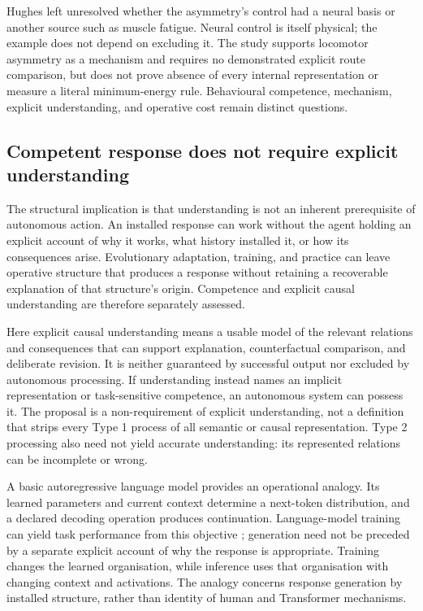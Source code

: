 \documentclass[11pt,a4paper]{article}
\theoremstyle{remark}
\begin{document}
Hughes left unresolved whether the asymmetry's control had a neural basis
or another source such as muscle fatigue. Neural control is itself physical;
the example does not depend on excluding it. The study supports locomotor
asymmetry as a mechanism and requires no demonstrated explicit route
comparison, but does not prove absence of every internal representation or
measure a literal minimum-energy rule. Behavioural competence, mechanism,
explicit understanding, and operative cost remain distinct questions.

\subsection{Competent response does not require explicit understanding}\label{sec:understanding}

The structural implication is that understanding is not an inherent
prerequisite of autonomous action. An installed response can work without
the agent holding an explicit account of why it works, what history installed
it, or how its consequences arise. Evolutionary adaptation, training, and
practice can leave operative structure that produces a response without
retaining a recoverable explanation of that structure's origin. Competence
and explicit causal understanding are therefore separately assessed.

Here explicit causal understanding means a usable model of the relevant
relations and consequences that can support explanation, counterfactual
comparison, and deliberate revision. It is neither guaranteed by successful
output nor excluded by autonomous processing. If understanding instead names
an implicit representation or task-sensitive competence, an autonomous
system can possess it. The proposal is a non-requirement of explicit
understanding, not a definition that strips every Type 1 process of all
semantic or causal representation. Type 2 processing also need not yield
accurate understanding: its represented relations can be incomplete or wrong.

A basic autoregressive language model provides an operational analogy.
Its learned parameters and current context determine a next-token
distribution, and a declared decoding operation produces continuation.
Language-model training can yield task performance from this objective
\citep{radford2019}; generation need not be preceded by a separate explicit
account of why the response is appropriate. Training changes the learned
organisation, while inference uses that organisation with changing context
and activations. The analogy concerns response generation by installed
structure, rather than identity of human and Transformer mechanisms.
\end{document}
